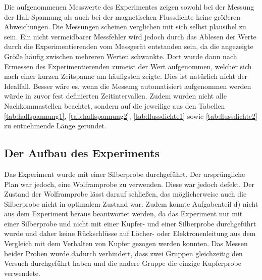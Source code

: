   Die aufgenommenen Messwerte des Experimentes zeigen sowohl bei der Messung der Hall-Spannung als auch
  bei der magnetischen Flussdichte keine größeren Abweichungen. Die Messungen scheinen verglichen mit sich selbst
  plausibel zu sein. Ein nicht vermeidbarer Messfehler wird jedoch durch das Ablesen der Werte durch
  die Experimentierenden vom Messgerät entstanden sein, da die angezeigte Größe häufig zwischen mehreren Werten schwankte. Dort wurde
  dann nach Ermessen des Experimentierenden zumeist der Wert aufgenommen, welcher sich nach einer kurzen Zeitspanne am
  häufigsten zeigte. Dies ist natürlich nicht der Idealfall. Besser wäre es, wenn die Messung automatisiert aufgenommen
  werden würde in zuvor fest definierten Zeitintervallen. Zudem wurden nicht alle Nachkommastellen beachtet, sondern auf
  die jeweilige aus den Tabellen \ref{tab:hallspannung1}, \ref{tab:hallspannung2}, \ref{tab:flussdichte1} sowie
  \ref{tab:flussdichte2} zu entnehmende Länge gerundet.
\subsection{Der Aufbau des Experiments}
  Das Experiment wurde mit einer Silberprobe durchgeführt. Der ursprüngliche Plan war jedoch, eine Wolframprobe zu
  verwenden. Diese war jedoch defekt. Der Zustand der Wolframprobe lässt darauf schließen, das möglicherweise auch die
  Silberprobe nicht in optimalem Zustand war. Zudem konnte Aufgabenteil d) nicht aus dem Experiment heraus beantwortet
  werden, da das Experiment nur mit einer Silberprobe und nicht mit einer Kupfer- und einer Silberprobe durchgeführt
  wurde und daher keine Rückschlüsse auf Löcher- oder Elektronenleitung aus dem Vergleich mit dem Verhalten von Kupfer
  gezogen werden konnten. Das Messen beider Proben wurde dadurch verhindert, dass zwei Gruppen gleichzeitig den Versuch durchgeführt haben
  und die andere Gruppe die einzige Kupferprobe verwendete.
\label{sec:Diskussion}
